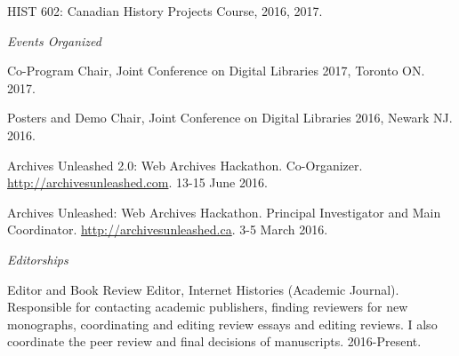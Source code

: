 \documentclass[11pt,article,oneside]{memoir}
\begin{document}
\ind HIST 602: Canadian History Projects Course, 2016, 2017.

%
\bigskip

\medskip
\noindent\emph{Events Organized \vspace{0.01in}}

\ind Co-Program Chair, Joint Conference on Digital Libraries 2017, Toronto ON. 2017.

\ind Posters and Demo Chair, Joint Conference on Digital Libraries 2016, Newark NJ. 2016.

\ind Archives Unleashed 2.0: Web Archives Hackathon. Co-Organizer. \href{http://archivesunleashed.com/}{http://archivesunleashed.com}. 13-15 June 2016.

\ind Archives Unleashed: Web Archives Hackathon. Principal Investigator and Main Coordinator. \href{http://archivesunleashed.ca/}{http://archivesunleashed.ca}. 3-5 March 2016.

\medskip

\noindent\emph{Editorships \vspace{0.01in}}

\ind Editor and Book Review Editor, Internet Histories (Academic Journal). Responsible for contacting academic publishers, finding reviewers for new monographs, coordinating and editing review essays and editing reviews. I also coordinate the peer review and final decisions of manuscripts. 2016-Present.
\end{document}
